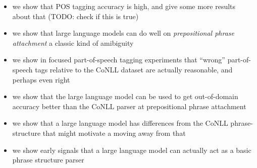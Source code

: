 \begin{itemize}
    \item we show that POS tagging accuracy is high, and give some more results about that (TODO: check if this is true)
    \item we show that large language models can do well on {\em prepositional phrase attachment} a classic kind of amibiguity
    \item we show in focused part-of-speech tagging experiments that ``wrong'' part-of-speech tags relative to the CoNLL dataset are actually reasonable, and perhaps even right
    \item we show that the large language model can be used to get out-of-domain accuracy better than the CoNLL parser at prepositional phrase attachment
    \item we show that a large language model has differences from the CoNLL phrase-structure that might motivate a moving away from that
    \item we show early signals that a large language model can actually act as a basic phrase structure parser
\end{itemize}
